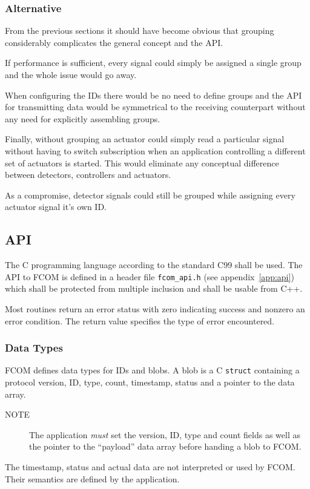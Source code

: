 \documentclass[11pt]{article}
\newcommand{\fcom}{FCOM}
\newcommand{\blob}{blob}
\newcommand{\group}{group}
\newcommand{\signal}{signal}
\newcommand{\note}[1]{
	\begin{description}
		\item[NOTE] #1
	\end{description}
}
\begin{document}
  \subsubsection{Alternative}
  From the previous sections it should have become obvious
  that grouping considerably complicates the general concept
  and the API. 

  If performance is sufficient, every \signal{} could simply
  be assigned a single \group{} and the whole issue would
  go away.

  When configuring the IDs there would be no need to define
  groups and the API for transmitting data would be symmetrical
  to the receiving counterpart without any need for explicitly
  assembling groups.

  Finally, without grouping an actuator could simply read
  a particular signal without having to switch subscription
  when an application controlling a different set of actuators
  is started. This would eliminate any conceptual difference
  between detectors, controllers and actuators.

  As a compromise, detector signals could still be \group{}ed
  while assigning every actuator signal it's own ID.

  \subsection{API}
  The C programming language according to the standard C99
  shall be used.
  The API to \fcom{} is defined in a header file {\tt fcom\_api.h}
  (see appendix~\ref{app:api}) which
  shall be protected from multiple inclusion and shall be usable from C++.

  Most routines return an error status with zero indicating success
  and nonzero an error condition. The return value specifies the type
  of error encountered.
    \subsubsection{Data Types}
      \fcom{} defines data types for IDs and \blob{}s. A
      \blob{} is a C {\tt struct} containing a protocol version,
      ID, type, count, timestamp, status and a pointer to
      the data array.

      \note{The application {\em must} set the version, ID, type and count
      fields as well as the pointer to the ``payload'' data array
      before handing a \blob{} to \fcom{}.}

      The timestamp,
      status and actual data are not interpreted or used by \fcom{}.
      Their semantics are defined by the application.
\end{document}
